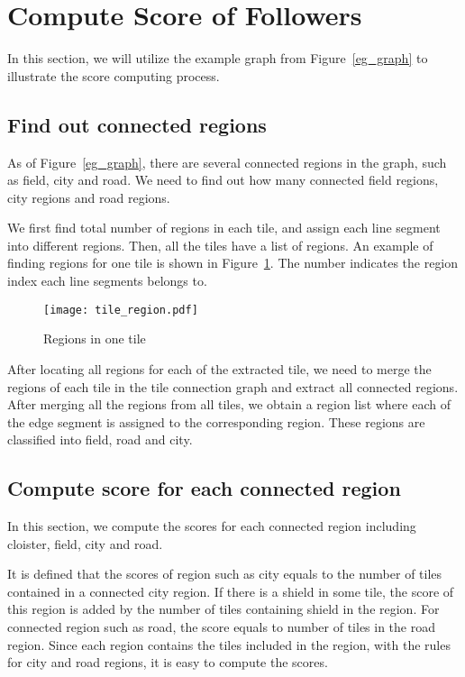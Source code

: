 \section{Compute Score of Followers}
In this section, we will utilize the example graph from Figure~\ref{eg_graph} to illustrate the score computing process.

\subsection{Find out connected regions}
As of Figure~\ref{eg_graph}, there are several connected regions in the graph, such as field, city and road. We need to find out how many 
connected field regions, city regions and road regions. 

We first find total number of regions in each tile, and assign each line segment into different regions. Then, all the tiles have a list 
of regions. An example of finding regions for one tile is shown in Figure~\ref{tile_region}. The number indicates the region index each 
line segments belongs to.

\begin{figure}[htbp]
	  \centering
	  \texttt{[image: tile\_region.pdf]}
	  \caption{Regions in one tile}
	  \label{tile_region}
\end{figure}

After locating all regions for each of the extracted tile, we need to merge the regions of each tile in the tile connection graph and extract 
all connected regions. After merging all the regions from all tiles, we obtain a region list where each of the edge segment is assigned to 
the corresponding region. These regions are classified into field, road and city.

\subsection{Compute score for each connected region}
In this section, we compute the scores for each connected region including cloister, field, city and road. 

It is defined that the scores of region such as city equals to the number of tiles 
contained in a connected city region. If there is a shield in some tile, the score of this region is added by the number of tiles containing 
shield in the region. For connected region such as road, the score equals to number of tiles in the road region. Since each region contains the tiles included in the region, with the rules for city and road regions, it is easy to compute the scores.

